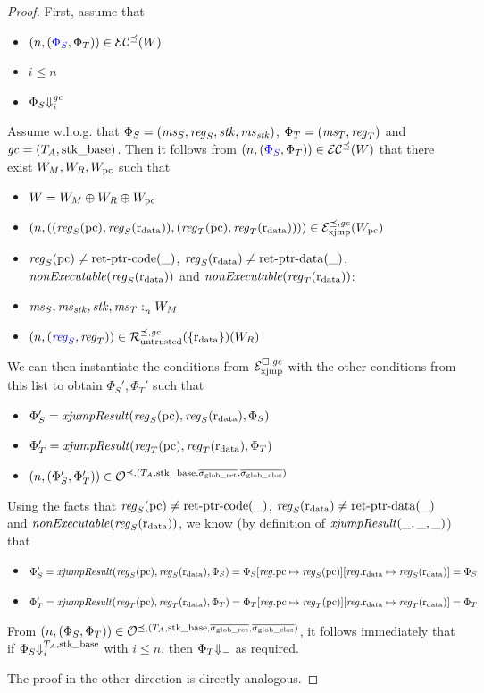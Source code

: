 \documentclass[a4paper]{article}
\begin{document}
\begin{proof}
  First, assume that 
  \begin{itemize}
  \item $\npair{\stpair{\Phi}{\Phi}}\in\lrec[\preceq](W)$
  \item $i \leq n$
  \item $\Phi_S \sterm[i]{\gc}$
  \end{itemize}

  Assume w.l.o.g. that $\Phi_S = (\ms_S,\reg_S,\stk,\ms_\stk)$, $\Phi_T = (\ms_T,\reg_T)$ and $\gc = (\ta,\stkb)$.
  Then it follows from $\npair{\stpair{\Phi}{\Phi}}\in\lrec[\preceq](W)$ that there exist $W_M,W_R,W_\pcreg$ such that
  \begin{itemize}
  \item $W = W_M \oplus W_R \oplus W_\pcreg$
  \item $\npair{( (\reg_S(\pcreg),\reg_S(\rdata)), (\reg_T(\pcreg),\reg_T(\rdata)) )} \in \lrexj[\preceq,\gc](W_\pcreg)$
  \item $\reg_S(\pcreg) \neq \retptrc(\_)$, $\reg_S(\rdata) \neq \retptrd(\_)$, $\nonExec{\reg_S(\rdata)}$ and $\nonExec{\reg_T(\rdata)}$:
  \item $\memSat{\ms_S,\ms_\stk,\stk,\ms_T}{W_M}$
  \item $\npair{\stpair{\reg}{\reg}} \in \lrr[\preceq,\gc](\{\rdata\})(W_R)$
  \end{itemize}

  We can then instantiate the conditions from $\lrexj$ with the other conditions from this list to obtain $\Phi_S',\Phi_T'$ such that
  \begin{itemize}
  \item $\Phi_S' = \xjumpResult{\reg_S(\pcreg)}{\reg_S(\rdata)}{\Phi_S}$ 
  \item $\Phi_T' = \xjumpResult{\reg_T(\pcreg)}{\reg_T(\rdata)}{\Phi_T}$
  \item $\npair{\left(\Phi_S', \Phi_T' \right)}\in \lrol$
  \end{itemize}

  Using the facts that $\reg_S(\pcreg) \neq \retptrc(\_)$, $\reg_S(\rdata) \neq \retptrd(\_)$ and $\nonExec{\reg_S(\rdata)}$, we know (by definition of $\xjumpResult{\_}{\_}{\_}$) that  
  \begin{itemize}
  \item $\Phi_S' = \xjumpResult{\reg_S(\pcreg)}{\reg_S(\rdata)}{\Phi_S} = \Phi_S\updReg{\pcreg}{\reg_S(\pcreg)}\updReg{\rdata}{\reg_S(\rdata)} = \Phi_S$ 
  \item $\Phi_T' = \xjumpResult{\reg_T(\pcreg)}{\reg_T(\rdata)}{\Phi_T} = \Phi_T\updReg{\pcreg}{\reg_T(\pcreg)}\updReg{\rdata}{\reg_T(\rdata)} = \Phi_T$ 
  \end{itemize}

  From $\npair{\left(\Phi_S, \Phi_T \right)}\in \lrol$, it follows immediately that if $\Phi_S \sterm[i]{\ta,\stkb}$ with $i \le n$, then $\Phi_T \term$ as required.

  The proof in the other direction is directly analogous.
\end{proof}
\end{document}
